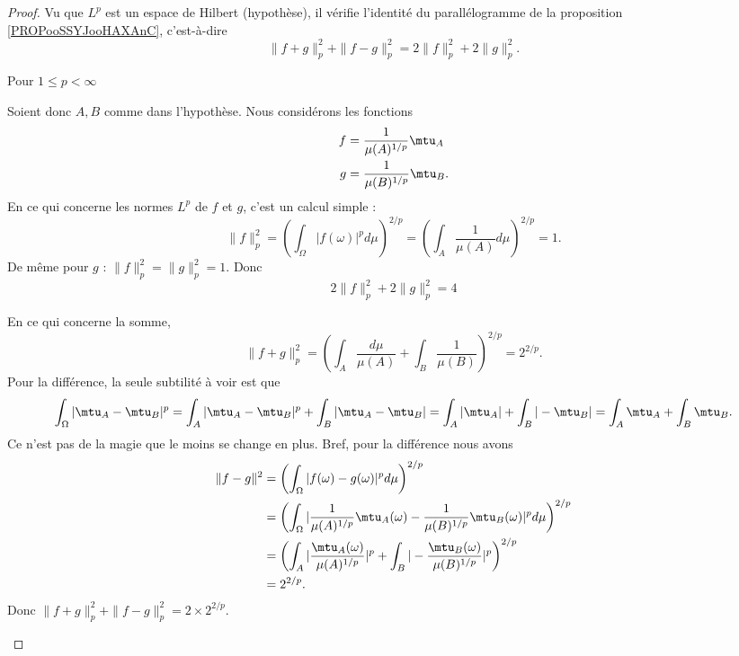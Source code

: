 \begin{proof}
	Vu que \( L^p\) est un espace de Hilbert (hypothèse), il vérifie l'identité du parallélogramme de la proposition \ref{PROPooSSYJooHAXAnC}, c'est-à-dire
	\begin{equation}        \label{EQooAKKYooURIbvi}
		\| f+g \|^2_p+\| f-g \|^2_p=2\| f \|_p^2+2\| g \|^2_p.
	\end{equation}

	\begin{subproof}
		\item[Pour \( 1\leq p<\infty\)]


		Soient donc \( A,B\) comme dans l'hypothèse. Nous considérons les fonctions
		\begin{subequations}
			\begin{align}
				f & =\frac{1}{ \mu(A)^{1/p} }\mtu_A  \\
				g & =\frac{1}{ \mu(B)^{1/p} }\mtu_B.
			\end{align}
		\end{subequations}
		En ce qui concerne les normes \( L^p\) de \( f\) et \( g\), c'est un calcul simple :
		\begin{equation}
			\| f \|_p^2=\left( \int_{\Omega}| f(\omega) |^pd\mu \right)^{2/p}=\left( \int_A\frac{1}{ \mu(A) }d\mu \right)^{2/p}=1.
		\end{equation}
		De même pour \( g\) : \( \| f \|_p^2=\| g \|_p^2=1\). Donc
		\begin{equation}
			2\| f \|_p^2+2\| g \|_p^2=4
		\end{equation}

		En ce qui concerne la somme,
		\begin{equation}
			\| f+g \|_p^2=\left( \int_A\frac{ d\mu }{ \mu(A) }+\int_B\frac{1}{ \mu(B) } \right)^{2/p}=2^{2/p}.
		\end{equation}
		Pour la différence, la seule subtilité à voir est que
		\begin{equation}
			\int_{\Omega}| \mtu_A-\mtu_B |^p=\int_A| \mtu_A-\mtu_B |^p+\int_B| \mtu_A-\mtu_B |=\int_A| \mtu_A |+\int_B| -\mtu_B |=\int_A\mtu_A+\int_B\mtu_B.
		\end{equation}
		Ce n'est pas de la magie que le moins se change en plus. Bref, pour la différence nous avons
		\begin{subequations}
			\begin{align}
				\| f-g \|^2 & =\left( \int_{\Omega}| f(\omega)-g(\omega) |^pd\mu \right)^{2/p}                                                                     \\
				            & =\left( \int_{\Omega}| \frac{1}{ \mu(A)^{1/p} }\mtu_A(\omega)-\frac{1}{ \mu(B)^{1/p} }\mtu_B(\omega) |^pd\mu \right)^{2/p}           \\
				            & =\left( \int_A| \frac{ \mtu_A(\omega) }{ \mu(A)^{1/p} } |^p   +\int_B| -\frac{ \mtu_B(\omega) }{ \mu(B)^{1/p} } |^p    \right)^{2/p} \\
				            & =2^{2/p}.
			\end{align}
		\end{subequations}
		Donc \( \| f+g \|^{2}_p+\| f-g \|_p^2=2\times 2^{2/p}\).


\end{subproof}
\end{proof}
